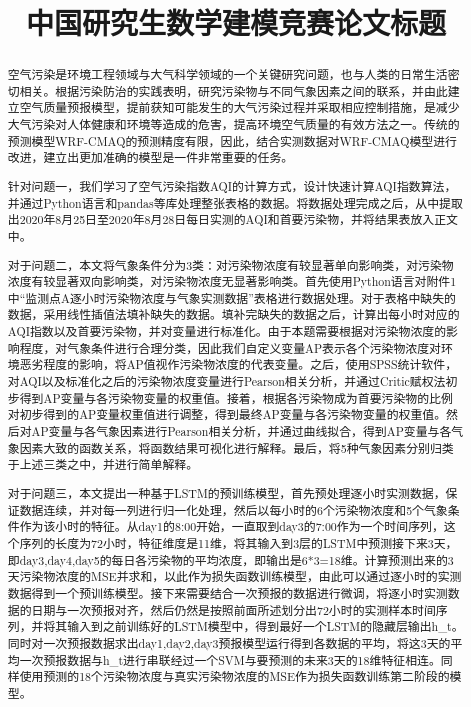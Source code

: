 \documentclass[bwprint]{gmcmthesis}
\title{中国研究生数学建模竞赛论文标题}
\numberwithin{figure}{section}
\begin{document}
 \maketitle
 \begin{abstract}
空气污染是环境工程领域与大气科学领域的一个关键研究问题，也与人类的日常生活密切相关。根据污染防治的实践表明，研究污染物与不同气象因素之间的联系，并由此建立空气质量预报模型，提前获知可能发生的大气污染过程并采取相应控制措施，是减少大气污染对人体健康和环境等造成的危害，提高环境空气质量的有效方法之一。传统的预测模型WRF-CMAQ的预测精度有限，因此，结合实测数据对WRF-CMAQ模型进行改进，建立出更加准确的模型是一件非常重要的任务。

针对问题一，我们学习了空气污染指数AQI的计算方式，设计快速计算AQI指数算法，并通过Python语言和pandas等库处理整张表格的数据。将数据处理完成之后，从中提取出2020年8月25日至2020年8月28日每日实测的AQI和首要污染物，并将结果表放入正文中。

对于问题二，本文将气象条件分为3类：对污染物浓度有较显著单向影响类，对污染物浓度有较显著双向影响类，对污染物浓度无显著影响类。首先使用Python语言对附件1中“监测点A逐小时污染物浓度与气象实测数据”表格进行数据处理。对于表格中缺失的数据，采用线性插值法填补缺失的数据。填补完缺失的数据之后，计算出每小时对应的AQI指数以及首要污染物，并对变量进行标准化。由于本题需要根据对污染物浓度的影响程度，对气象条件进行合理分类，因此我们自定义变量AP表示各个污染物浓度对环境恶劣程度的影响，将AP值视作污染物浓度的代表变量。之后，使用SPSS统计软件，对AQI以及标准化之后的污染物浓度变量进行Pearson相关分析，并通过Critic赋权法初步得到AP变量与各污染物变量的权重值。接着，根据各污染物成为首要污染物的比例对初步得到的AP变量权重值进行调整，得到最终AP变量与各污染物变量的权重值。然后对AP变量与各气象因素进行Pearson相关分析，并通过曲线拟合，得到AP变量与各气象因素大致的函数关系，将函数结果可视化进行解释。最后，将5种气象因素分别归类于上述三类之中，并进行简单解释。

对于问题三，本文提出一种基于LSTM的预训练模型，首先预处理逐小时实测数据，保证数据连续，并对每一列进行归一化处理，然后以每小时的6个污染物浓度和5个气象条件作为该小时的特征。从day1的8:00开始，一直取到day3的7:00作为一个时间序列，这个序列的长度为72小时，特征维度是11维，将其输入到3层的LSTM中预测接下来3天，即day3,day4,day5的每日各污染物的平均浓度，即输出是6*3=18维。计算预测出来的3天污染物浓度的MSE并求和，以此作为损失函数训练模型，由此可以通过逐小时的实测数据得到一个预训练模型。接下来需要结合一次预报的数据进行微调，将逐小时实测数据的日期与一次预报对齐，然后仍然是按照前面所述划分出72小时的实测样本时间序列，并将其输入到之前训练好的LSTM模型中，得到最好一个LSTM的隐藏层输出h_t。同时对一次预报数据求出day1,day2,day3预报模型运行得到各数据的平均，将这3天的平均一次预报数据与h_t进行串联经过一个SVM与要预测的未来3天的18维特征相连。同样使用预测的18个污染物浓度与真实污染物浓度的MSE作为损失函数训练第二阶段的模型。


\end{abstract}
\end{document}
